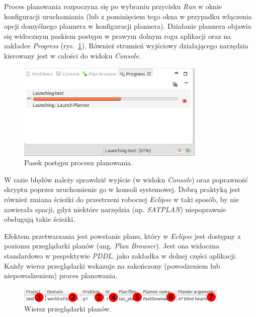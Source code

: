Proces planowania rozpoczyna się po wybraniu przycisku \textit{Run} w oknie konfiguracji uruchamiania (lub z pominięciem tego okna w przypadku włączenia opcji domyślnego plannera w konfiguracji plannera). Działanie plannera objawia się widocznym paskiem postępu w prawym dolnym rogu aplikacji oraz na zakładce \textit{Progress} (rys.~\ref{fig:run_progress}). Również strumień wyjściowy działającego narzędzia kierowany jest w całości do widoku \textit{Console}.

\begin{figure}[h!]
    \centering
    \includegraphics[width=0.8\textwidth]{img/run_progress}
    \caption{Pasek postępu procesu planowania.}
    \label{fig:run_progress}
\end{figure}

W razie błędów należy sprawdzić wyjście (w widoku \textit{Console}) oraz poprawność skryptu poprzez uruchomienie go w konsoli systemowej. Dobrą praktyką jest również zmiana ścieżki do przestrzeni roboczej \textit{Eclipse} w taki sposób, by nie zawierała spacji, gdyż niektóre narzędzia (np. \textit{SATPLAN}) niepoprawnie obsługują takie ścieżki.

Efektem przetwarzania jest powstanie planu, który w \textit{Eclipse} jest dostępny z poziomu przeglądarki planów (ang. \textit{Plan Browser}). Jest ona widoczna standardowo w pespektywie \textit{PDDL}, jako zakładka w dolnej części aplikacji. Każdy wiersz przeglądarki wskazuje na zakończony (powodzeniem lub niepowodzeniem) proces planowania. 

\begin{figure}[h!]
    \centering
    \includegraphics[width=0.9\textwidth]{img/plan_browser_row}
    \caption{Wiersz przeglądarki planów.}
    \label{fig:plan_browser_row}
\end{figure}


